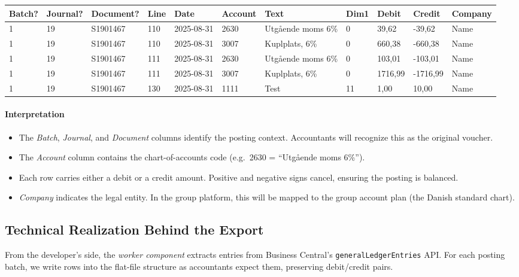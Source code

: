 \documentclass[a4paper,10pt]{article}
\begin{document}
\begin{table}[H]
\centering
\footnotesize %
\begin{tabular}{lllllllllll}
\toprule
Batch? & Journal? & Document? & Line & Date & Account & Text & Dim1 & Debit & Credit & Company \\
\midrule
1 & 19 & S1901467 & 110 & 2025-08-31 & 2630 & Utgående moms 6\% & 0 & 39,62 & -39,62 & Name \\
1 & 19 & S1901467 & 110 & 2025-08-31 & 3007 & Kuplplats, 6\% & 0 & 660,38 & -660,38 & Name \\
1 & 19 & S1901467 & 111 & 2025-08-31 & 2630 & Utgående moms 6\% & 0 & 103,01 & -103,01 & Name \\
1 & 19 & S1901467 & 111 & 2025-08-31 & 3007 & Kuplplats, 6\% & 0 & 1716,99 & -1716,99 & Name \\
1 & 19 & S1901467 & 130 & 2025-08-31 & 1111 & Test & 11 & 1,00 & 10,00 & Name \\
\bottomrule
\end{tabular}
\end{table}

\paragraph{Interpretation}

\begin{itemize}
  \item The \emph{Batch}, \emph{Journal}, and \emph{Document} columns identify the posting context. Accountants will recognize this as the original voucher.
  \item The \emph{Account} column contains the chart-of-accounts code (e.g.\ 2630 = ``Utgående moms 6\%'').
  \item Each row carries either a debit or a credit amount. Positive and negative signs cancel, ensuring the posting is balanced.
  \item \emph{Company} indicates the legal entity. In the group platform, this will be mapped to the group account plan (the Danish standard chart).
\end{itemize}

\subsection{Technical Realization Behind the Export}

From the developer’s side, the \textit{worker component} extracts entries from Business Central’s \texttt{generalLedgerEntries} API. For each posting batch, we write rows into the flat-file structure as accountants expect them, preserving debit/credit pairs. 
\end{document}

